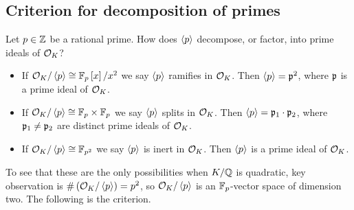 \pagebreak

\subsection{Criterion for decomposition of primes}

Let $ p \in \Z $ be a rational prime. How does $ \ab{p} $ decompose, or factor, into prime ideals of $ \OO_K $?
\begin{itemize}
\item If $ \OO_K / \ab{p} \cong \F_p\sb{x} / x^2 $ we say $ \ab{p} $ ramifies in $ \OO_K $. Then $ \ab{p} = \pp^2 $, where $ \pp $ is a prime ideal of $ \OO_K $.
\item If $ \OO_K / \ab{p} \cong \F_p \times \F_p $ we say $ \ab{p} $ splits in $ \OO_K $. Then $ \ab{p} = \pp_1 \cdot \pp_2 $, where $ \pp_1 \ne \pp_2 $ are distinct prime ideals of $ \OO_K $.
\item If $ \OO_K / \ab{p} \cong \F_{p^2} $ we say $ \ab{p} $ is inert in $ \OO_K $. Then $ \ab{p} $ is a prime ideal of $ \OO_K $.
\end{itemize}
To see that these are the only possibilities when $ K / \Q $ is quadratic, key observation is $ \#\rb{\OO_K / \ab{p}} = p^2 $, so $ \OO_K / \ab{p} $ is an $ \F_p $-vector space of dimension two. The following is the criterion.


